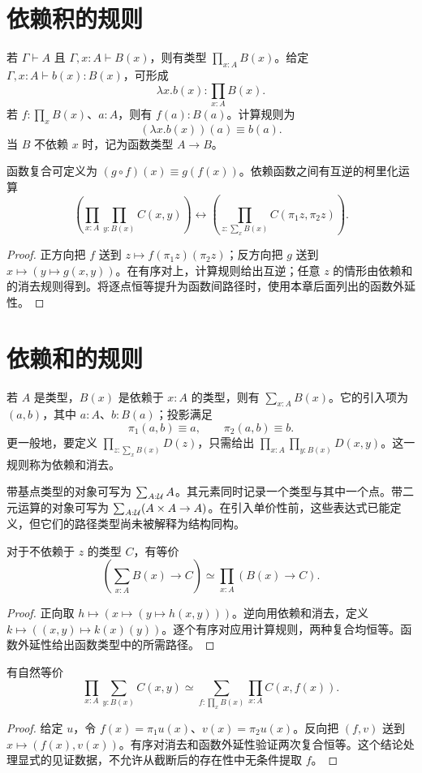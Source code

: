 \section{依赖积的规则}
\begin{definition}[依赖积]
若 $\Gamma\vdash A$ 且 $\Gamma,x:A\vdash B(x)$，则有类型 $\prod_{x:A}B(x)$。给定 $\Gamma,x:A\vdash b(x):B(x)$，可形成
\[
\lambda x.b(x):\prod_{x:A}B(x).
\]
若 $f:\prod_xB(x)$、$a:A$，则有 $f(a):B(a)$。计算规则为
\[
(\lambda x.b(x))(a)\equiv b(a).
\]
当 $B$ 不依赖 $x$ 时，记为函数类型 $A\to B$。
\end{definition}
\begin{proposition}[复合与柯里化]
函数复合可定义为 $(g\circ f)(x)\equiv g(f(x))$。依赖函数之间有互逆的柯里化运算
\[
\left(\prod_{x:A}\prod_{y:B(x)}C(x,y)\right)
\longleftrightarrow
\left(\prod_{z:\sum_xB(x)}C(\pi_1z,\pi_2z)\right).
\]
\end{proposition}
\begin{proof}
正方向把 $f$ 送到 $z\mapsto f(\pi_1z)(\pi_2z)$；反方向把 $g$ 送到 $x\mapsto(y\mapsto g(x,y))$。在有序对上，计算规则给出互逆；任意 $z$ 的情形由依赖和的消去规则得到。将逐点恒等提升为函数间路径时，使用本章后面列出的函数外延性。
\end{proof}

\section{依赖和的规则}
\begin{definition}[依赖和]
若 $A$ 是类型，$B(x)$ 是依赖于 $x:A$ 的类型，则有 $\sum_{x:A}B(x)$。它的引入项为 $(a,b)$，其中 $a:A$、$b:B(a)$；投影满足
\[
\pi_1(a,b)\equiv a,\qquad \pi_2(a,b)\equiv b.
\]
更一般地，要定义 $\prod_{z:\sum_xB(x)}D(z)$，只需给出 $\prod_{x:A}\prod_{y:B(x)}D(x,y)$。这一规则称为依赖和消去。
\end{definition}
\begin{example}
带基点类型的对象可写为 $\sum_{A:\mathcal U}A$。其元素同时记录一个类型与其中一个点。带二元运算的对象可写为 $\sum_{A:\mathcal U}(A\times A\to A)$。在引入单价性前，这些表达式已能定义，但它们的路径类型尚未被解释为结构同构。
\end{example}
\begin{proposition}[依赖和的泛性质]
对于不依赖于 $z$ 的类型 $C$，有等价
\[
\left(\sum_{x:A}B(x)\to C\right)
\simeq\prod_{x:A}(B(x)\to C).
\]
\end{proposition}
\begin{proof}
正向取 $h\mapsto(x\mapsto(y\mapsto h(x,y)))$。逆向用依赖和消去，定义 $k\mapsto((x,y)\mapsto k(x)(y))$。逐个有序对应用计算规则，两种复合均恒等。函数外延性给出函数类型中的所需路径。
\end{proof}
\begin{proposition}[依赖选择公式]
有自然等价
\[
\prod_{x:A}\sum_{y:B(x)}C(x,y)
\simeq
\sum_{f:\prod_xB(x)}\prod_{x:A}C(x,f(x)).
\]
\end{proposition}
\begin{proof}
给定 $u$，令 $f(x)=\pi_1u(x)$、$v(x)=\pi_2u(x)$。反向把 $(f,v)$ 送到 $x\mapsto(f(x),v(x))$。有序对消去和函数外延性验证两次复合恒等。这个结论处理显式的见证数据，不允许从截断后的存在性中无条件提取 $f$。
\end{proof}


